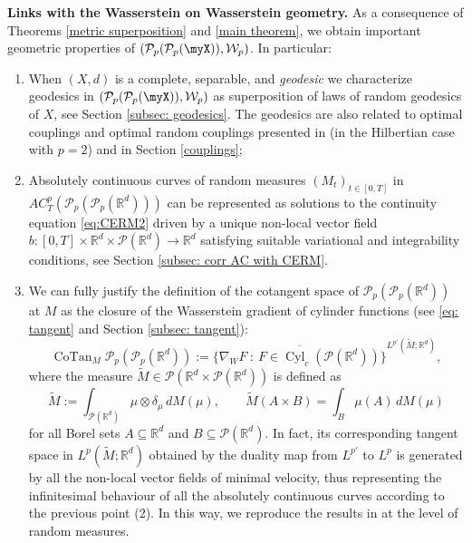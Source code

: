 \documentclass[10pt,leqno]{amsart}
\numberwithin{equation}{section}
\newcommand{\R}{\mathbb{R}}
\newcommand{\PP}{\mathcal{P}}
\begin{document}
\textbf{Links with the Wasserstein on Wasserstein geometry.}
As a consequence of Theorems \ref{metric superposition} and \ref{main theorem}, we obtain important geometric
properties of $(\PP_p(\PP_p(\myX)),\mathcal{W}_p)$. In particular:
\begin{enumerate}
    \item 
When $(X,d)$ is 
a complete, separable, and \emph{geodesic}
 we characterize 
 geodesics in
 $(\PP_p(\PP_p(\myX)),\mathcal{W}_p)$ as superposition of 
 laws of random 
 geodesics of $X$, see Section \ref{subsec: geodesics}. 
 The geodesics are also related to optimal couplings and optimal random couplings presented in \cite{PS25convex} (in the Hilbertian case with $p=2$) 
 and in Section \ref{couplings};
    \item Absolutely continuous curves of random measures $(M_t)_{t\in[0,T]}$ in $AC_T^p(\PP_p(\PP_p(\R^d)))$ 
    can be represented 
     as solutions to 
    the continuity equation 
    \eqref{eq:CERM2} 
    driven by 
    a unique non-local vector field $b:[0,T]\times \R^d \times \PP(\R^d) \to \R^d$ 
    satisfying suitable variational and integrability conditions, 
    see Section \ref{subsec: corr AC with CERM}. 
    \item
    We can fully justify the definition 
    of the cotangent space 
    of $\PP_p(\PP_p(\R^d))$ at $M$ as the closure of the Wasserstein gradient of cylinder functions (see \eqref{eq: tangent} and Section \ref{subsec: tangent}):
    \begin{equation}\label{eq: cotangent-intro}
        \operatorname{CoTan}_M \PP_p(\PP_p(\R^d)) := 
        \overline{
        \Big\{\nabla_W F \ : \ F\in\operatorname{Cyl}_c(\PP(\R^d)) \Big\} }^{L^{p'}(\widetilde{M};\R^d)},
    \end{equation}
    where the measure $\widetilde{M} \in \PP(\R^d \times \PP(\R^d))$ is defined as 
    \[\widetilde{M} := \int_{\PP(\R^d)} \mu \otimes \delta_{\mu}\, dM(\mu),
\qquad
\widetilde{M}(A \times B) = \int_{B} \mu(A)\, dM(\mu)
\]
for all Borel sets \(A \subseteq \R^d\) and \(B \subseteq \PP(\R^d)\).
    In fact, its corresponding tangent space 
    in $L^{p}(\widetilde{M};\R^d)$
    obtained by the duality map from $L^{p'}$ to $L^p$ is generated by 
    all the non-local vector fields of minimal velocity, thus representing
    the infinitesimal behaviour of
    all the absolutely continuous curves according to the previous point (2). In this way,
    we reproduce the results in \cite[Chapter 8.4]{ambrosio2005gradient} 
    at the level of random measures.
\end{enumerate}
\end{document}
